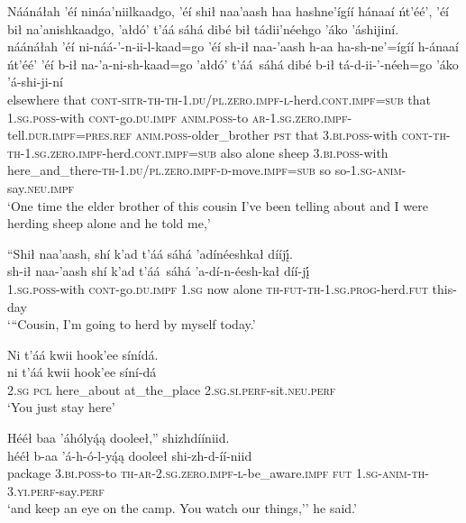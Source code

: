 \ea\label{ex:text6-14-1}
Náánáłah ’éí nináa’niilkaadgo, ’éí shił naa’aash haa hashne’ígíí hánaaí ńt’éé’, ’éí bił na’anishkaadgo, ’ałdó’ t’áá sáhá dibé bił tádii’néehgo ’áko ’áshijiní.\\
\gll náánáłah	’éí	ni-náá-’-n-ii-l-kaad=go	’éí	sh-ił	naa-’aash	h-aa	ha-sh-ne’=ígíí	h-ánaaí	ńt’éé’	’éí	b-ił	na-’a-ni-sh-kaad=go	’ałdó’	t’áá~{sáhá}	dibé	b-ił	tá-d-ii-’-néeh=go	’áko	’á-shi-ji-ní\\
     elsewhere	that	\textsc{cont}-\textsc{sitr}-\textsc{th}-\textsc{th}-1.\textsc{du}/\textsc{pl}.\textsc{zero}.\textsc{impf}-\textsc{l}-herd.\textsc{cont}.\textsc{impf}=\textsc{sub}	that	1.\textsc{sg}.\textsc{poss}-with	\textsc{cont}-go.\textsc{du}.\textsc{impf}	\textsc{anim}.\textsc{poss}-to	\textsc{ar}-1.\textsc{sg}.\textsc{zero}.\textsc{impf}-tell.\textsc{dur}.\textsc{impf}=\textsc{pres}.\textsc{ref}	\textsc{anim}.\textsc{poss}-older\_brother	\textsc{pst}	that	3.\textsc{bi}.\textsc{poss}-with	\textsc{cont}-\textsc{th}-\textsc{th}-1.\textsc{sg}.\textsc{zero}.\textsc{impf}-herd.\textsc{cont}.\textsc{impf}=\textsc{sub}	also	alone	sheep	3.\textsc{bi}.\textsc{poss}-with	here\_and\_there-\textsc{th}-1.\textsc{du}/\textsc{pl}.\textsc{zero}.\textsc{impf}-\textsc{d}-move.\textsc{impf}=\textsc{sub}	so	so-1.\textsc{sg}-\textsc{anim}-say.\textsc{neu}.\textsc{impf}\\
\glt `One time the elder brother of this cousin I've been telling about and I were herding sheep alone and he told me,'
\z

\ea\label{ex:text6-14-2}
``Shił naa’aash, shí k’ad t’áá sáhá ’adínéeshkał dííjį́.\\
\gll sh-ił	naa-’aash	shí	k’ad	t’áá~{sáhá}	’a-dí-n-éesh-kał	díí-jį́\\
     1.\textsc{sg}.\textsc{poss}-with	\textsc{cont}-go.\textsc{du}.\textsc{impf}	1.\textsc{sg}	now	alone	\textsc{th}-\textsc{fut}-\textsc{th}-1.\textsc{sg}.\textsc{prog}-herd.\textsc{fut}	this-day\\
\glt `{``}Cousin, I'm going to herd by myself today.'
\z

\ea\label{ex:text6-14-3}
Ni t’áá kwii hook’ee sínídá.\\
\gll ni	t’áá	kwii	hook’ee	síní-dá\\
     2.\textsc{sg}	\textsc{pcl}	here\_about	at\_the\_place	2.\textsc{sg}.\textsc{si}.\textsc{perf}-sit.\textsc{neu}.\textsc{perf}\\
\glt `You just stay here'
\z

\ea\label{ex:text6-14-4}
Hééł baa ’áhólyą́ą dooleeł,'' shizhdííniid.\\
\gll hééł	b-aa	’á-h-ó-l-yą́ą	dooleeł	shi-zh-d-íí-niid\\
     package	3.\textsc{bi}.\textsc{poss}-to	\textsc{th}-\textsc{ar}-2.\textsc{sg}.\textsc{zero}.\textsc{impf}-\textsc{l}-be\_aware.\textsc{impf}	\textsc{fut}	1.\textsc{sg}-\textsc{anim}-\textsc{th}-3.\textsc{yi}.\textsc{perf}-say.\textsc{perf}\\
\glt `and keep an eye on the camp. You watch our things,'' he said.'
\z

